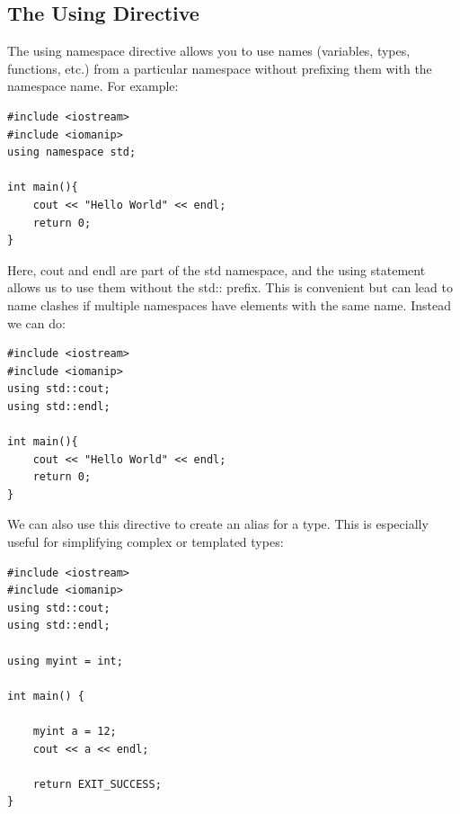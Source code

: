 \documentclass{report}
\begin{document}
    \pagebreak \bigbreak \noindent 
    \subsection{The Using Directive}
    \bigbreak \noindent 
    The using namespace directive allows you to use names (variables, types, functions, etc.) from a particular namespace without prefixing them with the namespace name. For example:
    \bigbreak \noindent 
    \sepline
    \begin{verbatim}
#include <iostream>
#include <iomanip>
using namespace std;

int main(){
    cout << "Hello World" << endl;
    return 0;
}
    \end{verbatim}
    \sepline
    \bigbreak \noindent 
    Here, cout and endl are part of the std namespace, and the using statement allows us to use them without the std:: prefix. This is convenient but can lead to name clashes if multiple namespaces have elements with the same name. Instead we can do:
    \bigbreak \noindent 
    \sepline
    \begin{verbatim}
#include <iostream>
#include <iomanip>
using std::cout;
using std::endl;

int main(){
    cout << "Hello World" << endl;
    return 0;
}
    \end{verbatim}
    \sepline
    \bigbreak \noindent 
    We can also use this directive to create an alias for a type. This is especially useful for simplifying complex or templated types:
    \bigbreak \noindent 
    \sepline
    \begin{verbatim}
#include <iostream>
#include <iomanip>
using std::cout;
using std::endl;

using myint = int;

int main() {
    
    myint a = 12;
    cout << a << endl;

    return EXIT_SUCCESS;
}
    \end{verbatim}
    \sepline

    \pagebreak \bigbreak \noindent 
\end{document}
